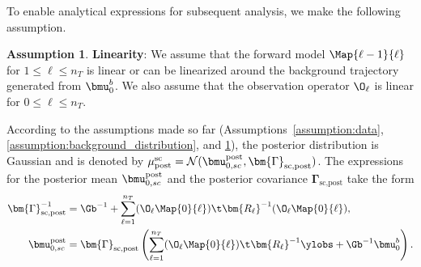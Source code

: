 \documentclass{aims} %
\theoremstyle{definition}
\newtheorem{assumption}{Assumption}
\begin{document}
To enable analytical expressions for subsequent analysis, we make the following assumption.
\begin{assumption}\label{assumption:forward_model}
    \textbf{Linearity}: We assume that the forward model $\Map{{\ell-1}}{\ell}$ for $1\le \ell \le n_T$ is linear or can be linearized around the background trajectory generated from $\bmu_0^b$. 
    We also assume that the observation operator $\O_\ell$ is linear for $0 \le \ell \le n_T$.
\end{assumption}
According to the assumptions made so far (Assumptions~\ref{assumption:data}, \ref{assumption:background_distribution}, and \ref{assumption:forward_model}), the posterior distribution is Gaussian and is denoted by $\mu_{\rm post}^{\rm sc} = \mathcal{N}(\bmu_{0,sc}^\text{post}, \bm{\Gamma}_{\text{sc,post}})$. The expressions for the posterior mean $\bmu_{0,sc}^\text{post}$ and the posterior covariance $\bm{\Gamma}_{\text{sc,post}}$ take the form 
\begin{align*}
    \bm{\Gamma}_{\text{sc,post}}^{-1} &= 
    {\Gb^{-1}}  
  +  \sum_{\ell = 1}^{n_T}
  (\O_\ell \Map{0}{{\ell}})\t 
  \bm{R_\ell}^{-1}
  (\O_\ell \Map{0}{{\ell}}),\\
 \bmu_{0,sc}^\text{post} &= \bm{\Gamma}_{\text{sc,post}} \left( \sum_{\ell = 1}^{n_T} (\O_\ell \Map{0}{{\ell}})\t\bm{R_\ell}^{-1} \ylobs
   +  \Gb^{-1} \bmu^{b}_0 \right).
   \end{align*}
%
\end{document}
